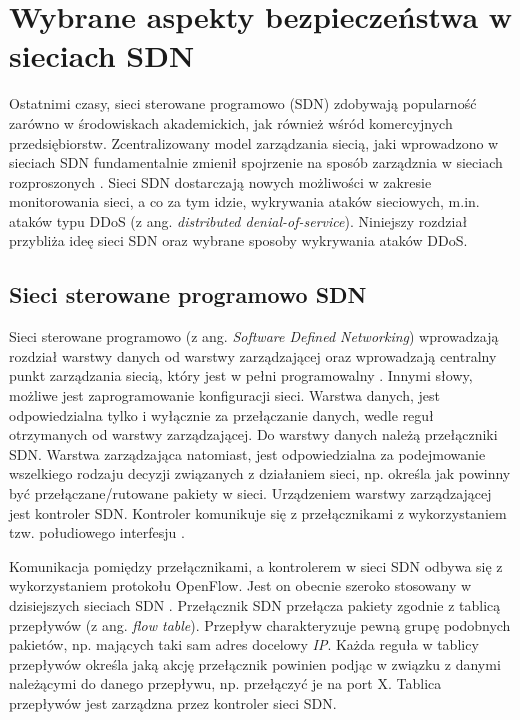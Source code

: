 \chapter{Wybrane aspekty bezpieczeństwa w sieciach SDN }

Ostatnimi czasy, sieci sterowane programowo (SDN) zdobywają popularność zarówno
w środowiskach akademickich, jak również wśród komercyjnych przedsiębiorstw.
Zcentralizowany model zarządzania siecią, jaki wprowadzono w sieciach SDN
fundamentalnie zmienił spojrzenie na sposób zarządznia w sieciach rozproszonych
\cite{ddosNYarticle}. Sieci SDN dostarczają nowych możliwości w zakresie
monitorowania sieci, a co za tym idzie, wykrywania ataków sieciowych, m.in.
ataków typu DDoS (z ang. \textit{distributed denial-of-service}). Niniejszy 
rozdział przybliża ideę sieci SDN oraz wybrane sposoby wykrywania ataków DDoS.

\section{Sieci sterowane programowo SDN}
Sieci sterowane programowo (z ang. \textit{Software Defined Networking})
wprowadzają rozdział warstwy danych od warstwy zarządzającej oraz wprowadzają
centralny punkt zarządzania siecią, który jest w pełni programowalny \cite{onf}.
Innymi słowy, możliwe jest zaprogramowanie konfiguracji sieci. Warstwa danych,
jest odpowiedzialna tylko i wyłącznie za przełączanie danych, wedle reguł
otrzymanych od warstwy zarządzającej. Do warstwy danych należą przełączniki SDN.
Warstwa zarządzająca natomiast, jest odpowiedzialna za podejmowanie wszelkiego
rodzaju decyzji związanych z działaniem sieci, np. określa jak powinny być
przełączane/rutowane pakiety w sieci. Urządzeniem warstwy zarządzającej jest
kontroler SDN. Kontroler komunikuje się z przełącznikami z wykorzystaniem tzw.
połudiowego interfesju \cite{sdninterfaces}.

Komunikacja pomiędzy przełącznikami, a kontrolerem w sieci SDN odbywa się z
wykorzystaniem protokołu OpenFlow. Jest on obecnie szeroko stosowany w
dzisiejszych sieciach SDN \cite{ddoskoreaarticle}. Przełącznik SDN przełącza
pakiety zgodnie z tablicą przepływów (z ang. \textit{flow table}). Przepływ
charakteryzuje pewną grupę podobnych pakietów, np. mających taki sam adres
docelowy \textit{IP}. Każda reguła w tablicy przepływów określa jaką akcję
przełącznik powinien podjąc w związku z danymi należącymi do danego
przepływu, np. przełączyć je na port X. Tablica przepływów jest zarządzna przez
kontroler sieci SDN.

